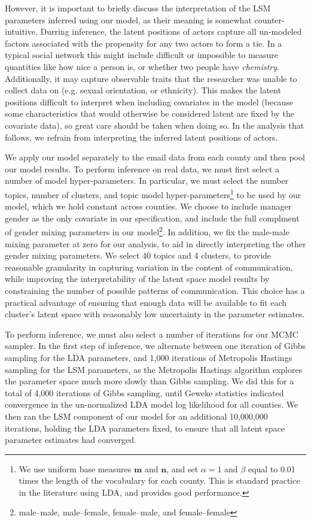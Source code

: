 \documentclass{pnastwo}
\begin{document}
\begin{article}
However, it is important to briefly discuss the interpretation of the LSM parameters inferred using our model, as their meaning is somewhat counter-intuitive. Durring inference, the latent positions of actors capture all un-modeled factors associated with the propensity for any two actors to form a tie. In a typical social network this might include difficult or impossible to measure quantities like how nice a person is, or whether two people have \emph{chemistry}. Additionally, it may capture observable traits that the researcher was unable to collect data on (e.g. sexual orientation, or ethnicity). This makes the latent positions difficult to interpret when including covariates in the model (because some characteristics that would otherwise be considered latent are fixed by the covariate data), so great care should be taken when doing so. In the analysis that follows, we refrain from interpreting the inferred latent positions of actors. 

We apply our model separately to the email data from each county and then pool our model results. To perform inference on real data, we must first select a number of model hyper-parameters. In particular, we must select the number topics, number of clusters, and topic model hyper-parameters\footnote{We use uniform base measures $\mathbf{m}$ and $\mathbf{n}$, and set $\alpha = 1$ and $\beta$ equal to 0.01 times the length of the vocabulary for each county. This is standard practice in the literature using LDA, and provides good performance.} to be used by our model, which we hold constant across counties. We choose to include manager gender as the only covariate in our specification, and include the full complment of gender mixing parameters in our model\footnote{male--male, male--female, female--male, and female--female}. In addition, we fix the male-male mixing parameter at zero for our analysis, to aid in directly interpreting the other gender mixing parameters. We select 40 topics and 4 clusters, to provide reasonable granularity in capturing variation in the content of communication, while improving the interpretability of the latent space model results by constraining the number of possible patterns of communication. This choice has a practical advantage of ensuring that enough data will be available to fit each cluster’s latent space with reasonably low uncertainty in the parameter estimates.

To perform inference, we must also select a number of iterations for our MCMC sampler. In the first step of inference, we alternate between one iteration of Gibbs sampling for the LDA parameters, and 1,000 iterations of Metropolis Hastings sampling for the LSM parameters, as the Metropolis Hastings algorithm explores the parameter space much more slowly than Gibbs sampling. We did this for a total of 4,000 iterations of Gibbs sampling, until Geweke statistics indicated convergence in the un-normalized LDA model log likelihood for all counties. We then ran the LSM component of our model for an additional 10,000,000 iterations, holding the LDA parameters fixed, to ensure that all latent space parameter estimates had converged.



\end{article}
\end{document}
